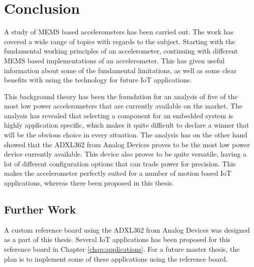\chapter{Conclusion}

A study of MEMS based accelerometers has been carried out. The work has covered a wide range of topics with regards to the subject. Starting with the fundamental working principles of an accelerometer, continuing with different MEMS based implementations of an accelerometer. This has given useful information about some of the fundamental limitations, as well as some clear benefits with using the technology for future IoT applications. 


This background theory has been the foundation for an analysis of five of the most low power accelerometers that are currently available on the market. The analysis has revealed that selecting a component for an embedded system is highly application specific, which makes it quite difficult to declare a winner that will be the obvious choice in every situation. The analysis has on the other hand showed that the ADXL362 from Analog Devices proves to be the most low power device currently available. This device also proves to be quite versatile, having a lot of different configuration options that can trade power for precision. This makes the accelerometer perfectly suited for a number of motion based IoT applications, whereas three  been proposed in this thesis. 

\section{Further Work}

A custom reference board using the ADXL362 from Analog Devices was designed as a part of this thesis. Several IoT applications has been proposed for this reference board in Chapter \ref{chap:applications}. For a future master thesis, the plan is to implement some of these applications using the reference board. 
